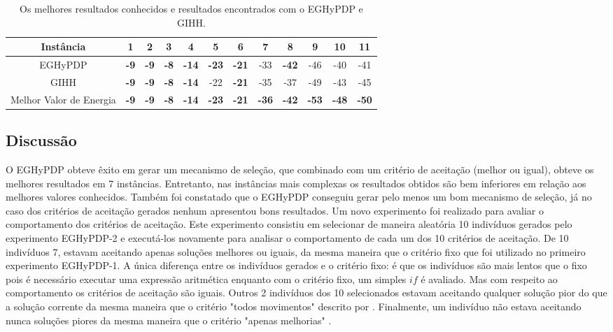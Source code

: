 	\begin{table}[]
		\centering
		\caption{Os melhores resultados conhecidos e resultados encontrados com o EGHyPDP e GIHH.}
		\label{tab:gihhandbhlh}
		\begin{tabular}{cccccccccccc}
			Instância         & 1 & 2 & 3 & 4  & 5  & 6  & 7  & 8  & 9  & 10 & 11 \\ \hline
			EGHyPDP  & \textbf{-9}   & \textbf{-9}    & \textbf{-8}   & \textbf{-14}   & \textbf{-23}   & \textbf{-21}  & -33  & \textbf{-42}   & -46   & -40   & -41   \\ \hline
			GIHH   & \textbf{-9} & \textbf{-9} & \textbf{-8} & \textbf{-14} & -22 & \textbf{-21} & -35 & -37 & -49 & -43 & -45 \\ \hline
			Melhor Valor de Energia   & \textbf{-9} & \textbf{-9} & \textbf{-8} & \textbf{-14} & \textbf{-23} & \textbf{-21} & \textbf{-36} & \textbf{-42} & \textbf{-53} & \textbf{-48} & \textbf{-50}
		\end{tabular}
	\end{table}
	
	
	\subsection{Discussão}
	O EGHyPDP obteve êxito em gerar um mecanismo de seleção, que combinado com um critério de aceitação (melhor ou igual), obteve os melhores resultados em 7 instâncias. Entretanto, nas instâncias mais complexas os resultados obtidos são bem inferiores em relação aos melhores valores conhecidos. Também foi constatado que o EGHyPDP conseguiu gerar pelo menos um bom mecanismo de seleção, já no caso dos critérios de aceitação gerados nenhum apresentou bons resultados. Um novo experimento foi realizado para avaliar o comportamento dos critérios de aceitação. Este experimento consistiu em selecionar de maneira aleatória 10 indivíduos gerados pelo experimento EGHyPDP-2 e executá-los novamente para analisar o comportamento de cada um dos 10 critérios de aceitação.
	De 10 indivíduos 7, estavam  aceitando apenas soluções melhores ou iguais, da mesma maneira que o critério fixo que foi utilizado no primeiro experimento EGHyPDP-1. A única diferença entre os indivíduos gerados e o critério fixo: é que os indivíduos são mais lentos que o fixo pois é necessário executar uma expressão aritmética enquanto com o critério fixo, um simples $if$ é avaliado. Mas com respeito ao comportamento os critérios de aceitação são iguais. Outros 2 indivíduos dos 10 selecionados estavam aceitando qualquer solução pior do que a solução corrente da mesma maneira que o critério "todos movimentos" descrito por \cite{burke2013hyper}. Finalmente, um indivíduo não estava aceitando nunca soluções piores da mesma maneira que o critério "apenas melhorias"        
	 \cite{burke2013hyper}.
	
